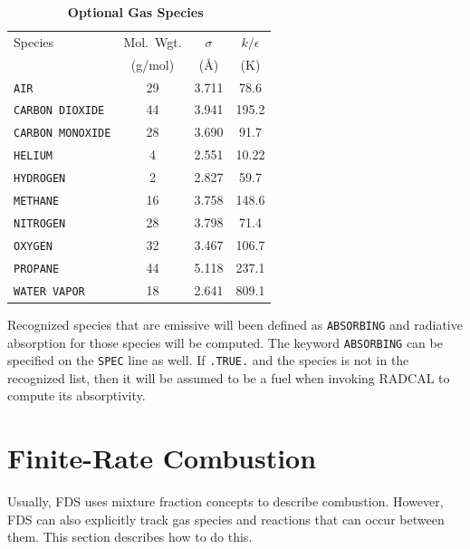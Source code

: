 \documentclass[11pt]{book}
\newcommand{\ct}{\tt\small}
\begin{document}
\begin{table}[t]
\begin{center}
\caption{\bf Optional Gas Species~\cite{Reid:1}}
\label{tab:gasspecies}
\vspace{0.1in}
\begin{tabular}{|l|c|c|c|}
\hline
Species &   Mol.~Wgt.        & $\sigma$  & $k/\epsilon$  \\
        &   (g/mol)          & (\AA)     & (K)            \\ \hline
\hline
{\ct AIR}             & 29   & 3.711     & 78.6           \\ \hline
{\ct CARBON DIOXIDE}  & 44   & 3.941     &195.2           \\ \hline
{\ct CARBON MONOXIDE} & 28   & 3.690     & 91.7           \\ \hline
{\ct HELIUM}          &  4   & 2.551     & 10.22          \\ \hline
{\ct HYDROGEN}        &  2   & 2.827     & 59.7           \\ \hline
{\ct METHANE}         & 16   & 3.758     &148.6           \\ \hline
{\ct NITROGEN}        & 28   & 3.798     & 71.4           \\ \hline
{\ct OXYGEN}          & 32   & 3.467     &106.7           \\ \hline
{\ct PROPANE}         & 44   & 5.118     &237.1           \\ \hline
{\ct WATER VAPOR}     & 18   & 2.641     &809.1           \\ \hline
\end{tabular}
\end{center}
\end{table}

Recognized species that are emissive will been defined as {\ct ABSORBING} and radiative absorption for those species
will be computed.  The keyword {\ct ABSORBING} can be specified on the {\ct SPEC} line as well.  If {\ct .TRUE.} and the
species is not in the recognized list, then it will be assumed to be a fuel when invoking RADCAL to compute its
absorptivity.

\clearpage

\section{Finite-Rate Combustion}
\label{info:finite}

Usually, FDS uses mixture fraction concepts to describe combustion. However, FDS can also explicitly track gas species and
reactions that can occur between them. This section describes how to do this.
\end{document}
